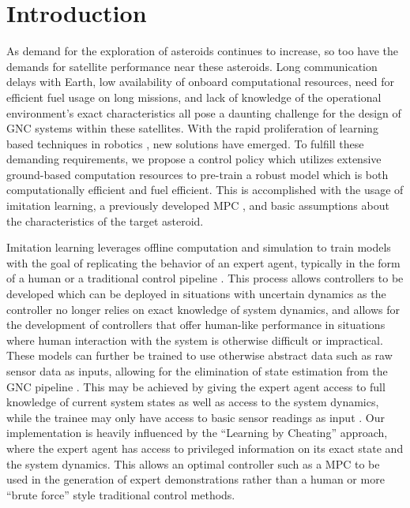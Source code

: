 \documentclass[twocolumn,letterpaper]{IEEEAerospaceCLS}
\begin{document}
\tableofcontents


\printnomenclature

\section{Introduction}

As demand for the exploration of asteroids continues to increase, so too have the demands for satellite performance near these asteroids. Long communication delays with Earth, low availability of onboard computational resources, need for efficient fuel usage on long missions, and lack of knowledge of the operational environment's exact characteristics all pose a daunting challenge for the design of GNC systems within these satellites. With the rapid proliferation of learning based techniques in robotics \cite{NewRef1,NewRef2,NewRef3,NewRef4,NewRef5,NewRef6,NewRef7,NewRef8,NewRef9,NewRef10,NewRef111}, new solutions have emerged. To fulfill these demanding requirements, we propose a control policy which utilizes extensive ground-based computation resources to pre-train a robust model \cite{Li2023-if} which is both computationally efficient and fuel efficient\cite{Kalaria2023-su,Scaramuzza2022-le}. This is accomplished with the usage of imitation learning, a previously developed MPC \cite{Tiwari2022-jt, Tiwari2022-ki}, and basic assumptions about the characteristics of the target asteroid.

Imitation learning leverages offline computation and simulation to train models with the goal of replicating the behavior of an expert agent, typically in the form of a human or a traditional control pipeline \cite{Attia2018-cy,Zare2023-kf}. This process allows controllers to be developed which can be deployed in situations with uncertain dynamics as the controller no longer relies on exact knowledge of system dynamics, and allows for the development of controllers that offer human-like performance in situations where human interaction with the system is otherwise difficult or impractical\cite{Lee2018-qh,Pan2020-rt}. These models can further be trained to use otherwise abstract data such as raw sensor data as inputs, allowing for the elimination of state estimation from the GNC pipeline \cite{Chen2020-ab,Pan2020-rt,Scaramuzza2022-le}. This may be achieved by giving the expert agent access to full knowledge of current system states as well as access to the system dynamics, while the trainee may only have access to basic sensor readings as input \cite{Zhang2016-ip,Chen2020-ab}. Our implementation is heavily influenced by the ``Learning by Cheating'' \cite{Chen2020-ab} approach, where the expert agent has access to privileged information on its exact state and the system dynamics. This allows an optimal controller such as a MPC to be used in the generation of expert demonstrations rather than a human or more ``brute force'' style traditional control methods.
\end{document}
